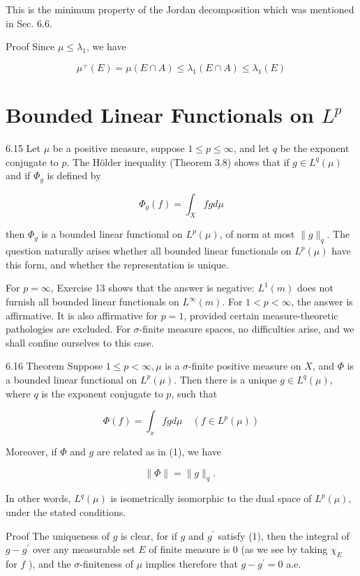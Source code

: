 \documentclass[10pt]{article}
\begin{document}
This is the minimum property of the Jordan decomposition which was mentioned in Sec. 6.6.

Proof Since $\mu \leq \lambda_{1}$, we have

$$
\mu^{+}(E)=\mu(E \cap A) \leq \lambda_{1}(E \cap A) \leq \lambda_{1}(E)
$$

\section{Bounded Linear Functionals on $L^{p}$}
6.15 Let $\mu$ be a positive measure, suppose $1 \leq p \leq \infty$, and let $q$ be the exponent conjugate to $p$. The Hölder inequality (Theorem 3.8) shows that if $g \in L^{q}(\mu)$ and if $\Phi_{g}$ is defined by

$$
\Phi_{g}(f)=\int_{X} f g d \mu
$$

then $\Phi_{g}$ is a bounded linear functional on $L^{p}(\mu)$, of norm at most $\|g\|_{q}$. The question naturally arises whether all bounded linear functionals on $L^{p}(\mu)$ have this form, and whether the representation is unique.

For $p=\infty$, Exercise 13 shows that the answer is negative: $L^{1}(m)$ does not furnish all bounded linear functionals on $L^{\infty}(m)$. For $1<p<\infty$, the answer is affirmative. It is also affirmative for $p=1$, provided certain measure-theoretic pathologies are excluded. For $\sigma$-finite measure spaces, no difficulties arise, and we shall confine ourselves to this case.

6.16 Theorem Suppose $1 \leq p<\infty, \mu$ is a $\sigma$-finite positive measure on $X$, and $\Phi$ is a bounded linear functional on $L^{p}(\mu)$. Then there is a unique $g \in L^{q}(\mu)$, where $q$ is the exponent conjugate to $p$, such that

$$
\Phi(f)=\int_{x} f g d \mu \quad\left(f \in L^{p}(\mu)\right)
$$

Moreover, if $\Phi$ and $g$ are related as in (1), we have

$$
\|\Phi\|=\|g\|_{q} \text {. }
$$

In other words, $L^{q}(\mu)$ is isometrically isomorphic to the dual space of $L^{p}(\mu)$, under the stated conditions.

Proof The uniqueness of $g$ is clear, for if $g$ and $g^{\prime}$ satisfy (1), then the integral of $g-g^{\prime}$ over any measurable set $E$ of finite measure is 0 (as we see by taking $\chi_{E}$ for $f$ ), and the $\sigma$-finiteness of $\mu$ implies therefore that $g-g^{\prime}=0$ a.e.
\end{document}
